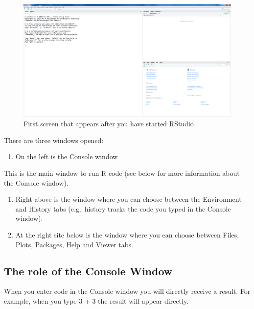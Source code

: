 \documentclass[]{book}
\providecommand{\tightlist}{%
  \setlength{\itemsep}{0pt}\setlength{\parskip}{0pt}}
\begin{document}
\begin{figure}

{\centering \includegraphics[width=0.95\linewidth]{images/fig1.10} 

}

\caption{First screen that appears after you have started RStudio}\label{fig:fig10}
\end{figure}

There are three windows opened:

\begin{enumerate}
\def\labelenumi{\arabic{enumi}.}
\tightlist
\item
  On the left is the Console window
\end{enumerate}

This is the main window to run R code (see below for more information
about the Console window).

\begin{enumerate}
\def\labelenumi{\arabic{enumi}.}
\setcounter{enumi}{1}
\item
  Right above is the window where you can choose between the Environment
  and History tabs (e.g.~history tracks the code you typed in the
  Console window).
\item
  At the right site below is the window where you can choose between
  Files, Plots, Packages, Help and Viewer tabs.
\end{enumerate}

\subsection{The role of the Console
Window}\label{the-role-of-the-console-window}

When you enter code in the Console window you will directly receive a
result. For example, when you type 3 + 3 the result will appear
directly.
\end{document}
